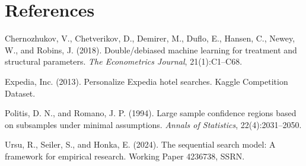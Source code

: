 \documentclass[11pt]{article}
\begin{document}

\section*{References}

\begin{description}\itemsep4pt
\item Chernozhukov, V., Chetverikov, D., Demirer, M., Duflo, E., Hansen, C.,
      Newey, W., and Robins, J. (2018). Double/debiased machine learning for
      treatment and structural parameters. \emph{The Econometrics Journal},
      21(1):C1--C68.
\item Expedia, Inc. (2013). Personalize Expedia hotel searches. Kaggle
      Competition Dataset.
\item Politis, D. N., and Romano, J. P. (1994). Large sample confidence regions
      based on subsamples under minimal assumptions. \emph{Annals of
      Statistics}, 22(4):2031--2050.
\item Ursu, R., Seiler, S., and Honka, E. (2024). The sequential search model:
      A framework for empirical research. Working Paper 4236738, SSRN.
\end{description}
\end{document}
